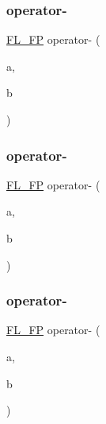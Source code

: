 \mbox{\label{class_f_l___f_p_a29c8d46e78c5c3a20fdfbf9904f0a25d}} 
\subsubsection{\texorpdfstring{operator-\/}{operator-}\hspace{0.1cm}{\footnotesize\ttfamily [1/3]}}
{\footnotesize\ttfamily \hyperlink{class_f_l___f_p}{F\+L\+\_\+\+FP} operator-\/ (\begin{DoxyParamCaption}\item[{const \hyperlink{class_f_l___f_p}{F\+L\+\_\+\+FP} \&}]{a,  }\item[{const \hyperlink{class_f_l___f_p}{F\+L\+\_\+\+FP} \&}]{b }\end{DoxyParamCaption})\hspace{0.3cm}{\ttfamily [friend]}}

\mbox{\label{class_f_l___f_p_a4355725c40ad917191e6384f58177915}} 
\subsubsection{\texorpdfstring{operator-\/}{operator-}\hspace{0.1cm}{\footnotesize\ttfamily [2/3]}}
{\footnotesize\ttfamily \hyperlink{class_f_l___f_p}{F\+L\+\_\+\+FP} operator-\/ (\begin{DoxyParamCaption}\item[{const \hyperlink{class_f_l___f_p}{F\+L\+\_\+\+FP} \&}]{a,  }\item[{const double \&}]{b }\end{DoxyParamCaption})\hspace{0.3cm}{\ttfamily [friend]}}

\mbox{\label{class_f_l___f_p_afede6b6bcb4b0e35903a5e47cb0096e1}} 
\subsubsection{\texorpdfstring{operator-\/}{operator-}\hspace{0.1cm}{\footnotesize\ttfamily [3/3]}}
{\footnotesize\ttfamily \hyperlink{class_f_l___f_p}{F\+L\+\_\+\+FP} operator-\/ (\begin{DoxyParamCaption}\item[{const double \&}]{a,  }\item[{const \hyperlink{class_f_l___f_p}{F\+L\+\_\+\+FP} \&}]{b }\end{DoxyParamCaption})\hspace{0.3cm}{\ttfamily [friend]}}

